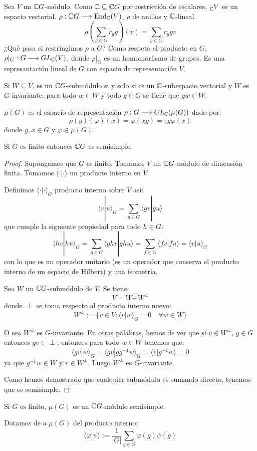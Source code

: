 Sea \(V\) un \(\mathbb{C} G\)-módulo. Como \(\mathbb{C}\subseteq\mathbb{C} G\) por restricción de
escalares, \(\prescript{}{\mathbb{C}}{V}\) es un espacio vectorial.
\(\rho:\mathbb{C} G\longrightarrow\operatorname{End}_{\mathbb{C}}(V)\), \(\rho\) de anillos y \(\mathbb{C}\)-lineal.
\[
  \rho(\sum_{g\in G} r_g g)(v)=\sum_{g\in G} r_g g v
\]
¿Qué pasa si restringimos \(\rho\) a \(G\)? Como respeta el producto en \(G\),
\(\rho|_G:G\longrightarrow GL_{\mathbb{C}}(V)\), donde \(\rho|_G\) es un homomorfismo
de grupos.
Es una represantación lineal de \(G\) con espacio de representación \(V\).

Si \(W\subseteq V\), es un \(\mathbb{C} G\)-submódulo si y solo si es un
\(\mathbb{C}\)-subespacio vectorial y \(W\) es \(G\) invariante:
para todo \(w\in W\) y todo \(g\in G\) se tiene que \(gw\in W\).

\(\mu(G)\) es el espacio de representación
\(\rho:G\longrightarrow GL_{\mathbb{C}}(\mu(G))\) dado por:
\[
  \rho(g)(\varphi)(x)=\varphi(xg)=:g\varphi(x)
\]
donde \(g,x\in G\) y \(\varphi\in\mu(G)\).

\begin{teo}
  Si \(G\) es finito entonces \(\mathbb{C} G\) es semisimple.
\end{teo}
\begin{proof}
  Supongamos que \(G\) es finito. Tomamos \(V\) un \(\mathbb{C} G\)-módulo de dimensión
  finita. Tomamos \(\langle\cdot|\cdot\rangle\) un producto interno en \(V\).

  Definimos \(\langle\cdot|\cdot\rangle_G\) producto interno sobre \(V\) así:
  \[
    \langle v|u\rangle_G=\sum_{g\in G} \langle gv| gu\rangle
  \]
  que cumple la siguiente propiedad para todo \(h\in G\):
  \[
    \langle hv|hu\rangle_G=\sum_{g\in G} \langle ghv| ghu\rangle
    =\sum_{f\in G} \langle fv| fu\rangle=\langle v|u\rangle_G
  \]
  con lo que es un operador unitario (es un operador que conserva el producto
  interno de un espacio de Hilbert) y una isometría.


  Sea \(W\) un \(\mathbb{C} G\)-submódulo de \(V\). Se tiene:
  \[
    V=W\dot{+} W^\perp
  \]
  donde \(\perp\) se toma respecto al producto interno nuevo:
  \[
    W^\perp :=\{v\in V: \langle v|w\rangle_G=0\quad\forall w\in W\}
  \]

  O sea \(W^\perp\) es \(G\)-invariante. En otras palabras, hemos de ver que
  si \(v\in W^\perp\), \(g\in G\) entonces \(gv\in\perp\), entonces para todo
  \(w\in W\) tenemos que:
  \[
    \langle gv|w\rangle_G=\langle gv|gg^{-1}w\rangle_G=
    \langle v|g^{-1} w\rangle=0
  \]
  ya que \(g^{-1}w\in W\) y \(v\in W^\perp\). Luego \(W^\perp\) es
  \(G\)-invariante.

  Como hemos demostrado que cualquier submódulo es sumando directo, tenemos
  que es semisimple.

\end{proof}

\begin{cor}
  Si \(G\) es finito, \(\mu(G)\) es un \(\mathbb{C} G\)-módulo semisimple.
\end{cor}

Dotamos de a \(\mu(G)\) del producto interno:
\[
  \langle \varphi|\psi\rangle:=
  \frac{1}{|G|}\sum_{g\in G}\varphi(g)\overline{\psi(g)}
\]




